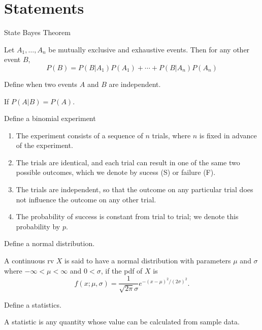 \section{Statements}
\begin{questions}
    \question[1] State Bayes Theorem
    \begin{solution}
        Let $A_1, \ldots, A_n$ be mutually exclusive and exhaustive
        events. Then for any other event $B$,
        $$P(B) = P(B|A_1)P(A_1) + \cdots + P(B|A_n)P(A_n)$$
    \end{solution}
    \question[1] Define when two events $A$ and $B$ are independent.
    \begin{solution}
        If $P(A|B) = P(A).$
    \end{solution}
    \question[1] Define a binomial experiment
    \begin{solution}
        \begin{enumerate}
        \item The experiment consists of a sequence of $n$ trials,
        where $n$ is fixed in advance of the experiment.
        \item The trials are identical, and each trial can result in
        one of the same two possible outcomes, which we denote by
        sucess (S) or failure (F).
        \item The trials are independent, so that the outcome on any 
        particular trial does not influence the outcome on any other
        trial.
        \item The probability of success is constant from trial to 
        trial; we denote this probability by $p$.   
        \end{enumerate}
    \end{solution}

    \question[1] Define a normal distribution.
    \begin{solution}
        A continuous rv $X$ is said to have a normal distribution with
    parameters $\mu$ and $\sigma$ where $- \infty < \mu < \infty$ and
    $0 < \sigma$, if the pdf of $X$ is 
    $$f(x; \mu, \sigma) = \frac{1}{\sqrt{2 \pi} \sigma} e^{
    -(x-\mu)^2/(2\sigma)^2}.$$
    \end{solution}

    \question[1] Define a statistics.
    \begin{solution}
        A statistic is any quantity whose value can be calculated from
    sample data.
    \end{solution}


\end{questions}
